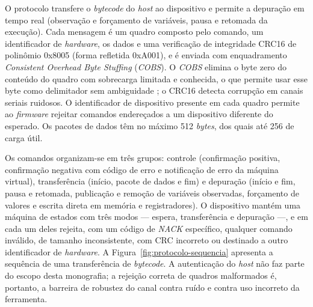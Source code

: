 O protocolo transfere o \textit{bytecode} do \textit{host} ao dispositivo e permite a depuração em tempo real (observação e forçamento de variáveis, pausa e retomada da execução).
Cada mensagem é um quadro composto pelo comando, um identificador de \textit{hardware}, os dados e uma verificação de integridade CRC16 de polinômio 0x8005 (forma refletida 0xA001), e é enviada com enquadramento \textit{Consistent Overhead Byte Stuffing} (\textit{COBS}).
O \textit{COBS} elimina o byte zero do conteúdo do quadro com sobrecarga limitada e conhecida, o que permite usar esse byte como delimitador sem ambiguidade \cite{cheshire:1999}; o CRC16 detecta corrupção em canais seriais ruidosos.
O identificador de dispositivo presente em cada quadro permite ao \textit{firmware} rejeitar comandos endereçados a um dispositivo diferente do esperado.
Os pacotes de dados têm no máximo 512 \textit{bytes}, dos quais até 256 de carga útil.

Os comandos organizam-se em três grupos: controle (confirmação positiva, confirmação negativa com código de erro e notificação de erro da máquina virtual), transferência (início, pacote de dados e fim) e depuração (início e fim, pausa e retomada, publicação e remoção de variáveis observadas, forçamento de valores e escrita direta em memória e registradores).
O dispositivo mantém uma máquina de estados com três modos --- espera, transferência e depuração ---, e em cada um deles rejeita, com um código de \textit{NACK} específico, qualquer comando inválido, de tamanho inconsistente, com CRC incorreto ou destinado a outro identificador de \textit{hardware}.
A Figura~\ref{fig:protocolo-sequencia} apresenta a sequência de uma transferência de \textit{bytecode}.
A autenticação do \textit{host} não faz parte do escopo desta monografia; a rejeição correta de quadros malformados é, portanto, a barreira de robustez do canal contra ruído e contra uso incorreto da ferramenta.

